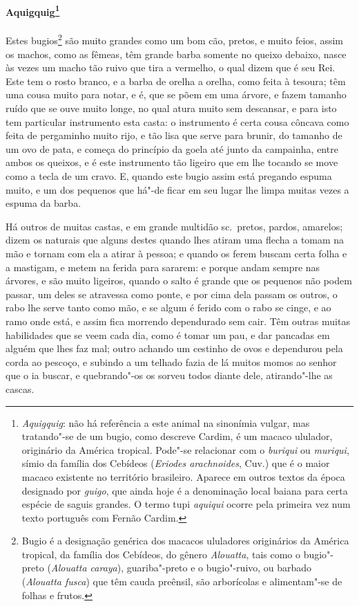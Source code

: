 \paragraph{Aquigquig\footnote{ \textit{Aquigquig}: não há
referência a este animal na sinonímia vulgar, mas tratando"-se de um
bugio, como descreve Cardim, é um macaco ululador, originário da
América tropical. Pode"-se relacionar com o \textit{buriqui} ou
\textit{muriqui}, símio da família dos Cebídeos (\textit{Eriodes 
arachnoides}, Cuv.) que é o maior macaco existente no território
brasileiro. Aparece em outros textos da época designado por
\textit{guigo}, que ainda hoje é a denominação local baiana para certa
espécie de saguis grandes. O termo tupi \textit{aquiqui} ocorre pela
primeira vez num texto português com Fernão Cardim.}} Estes
bugios\footnote{ Bugio é a designação genérica dos macacos
ululadores originários da América tropical, da família dos Cebídeos, 
do gênero \textit{Alouatta}, tais como o bugio"-preto (\textit{Alouatta
caraya}), guariba"-preto e o bugio"-ruivo, ou barbado 
(\textit{Alouatta fusca}) que têm cauda preênsil, são arborícolas e
alimentam"-se de folhas e frutos.} são muito grandes como um bom cão,
pretos, e muito feios, assim os machos, como as fêmeas, têm grande
barba somente no queixo debaixo, nasce às vezes um macho tão ruivo que
tira a vermelho, o qual dizem que é seu Rei. Este tem o rosto branco, e
a barba de orelha a orelha, como feita à tesoura; têm uma cousa muito
para notar, e é, que se põem em uma árvore, e fazem tamanho ruído que
se ouve muito longe, no qual atura muito sem descansar, e para isto tem
particular instrumento esta casta: o instrumento é certa cousa côncava
como feita de pergaminho muito rijo, e tão lisa que serve para brunir,
do tamanho de um ovo de pata, e começa do princípio da goela até junto
da campainha, entre ambos os queixos, e é este instrumento tão ligeiro
que em lhe tocando se move como a tecla de um cravo. E, quando este
bugio assim está pregando espuma muito, e um dos pequenos que há"-de
ficar em seu lugar lhe limpa muitas vezes a espuma da barba.

 Há outros de muitas castas, e em grande multidão sc.~pretos, pardos,
amarelos; dizem os naturais que alguns destes quando lhes atiram uma
flecha a tomam na mão e tornam com ela a atirar à pessoa; e quando os
ferem buscam certa folha e a mastigam, e metem na ferida para sararem:
e porque andam sempre nas árvores, e são muito ligeiros, quando o salto
é grande que os pequenos não podem passar, um deles se atravessa como
ponte, e por cima dela passam os outros, o rabo lhe serve tanto como
mão, e se algum é ferido com o rabo se cinge, e ao ramo onde está, e
assim fica morrendo dependurado sem cair. Têm outras muitas habilidades
que se veem cada dia, como é tomar um pau, e dar pancadas em alguém que
lhes faz mal; outro achando um cestinho de ovos e dependurou pela corda
ao pescoço, e subindo a um telhado fazia de lá muitos momos ao senhor
que o ia buscar, e quebrando"-os os sorveu todos diante dele,
atirando"-lhe as cascas. 

